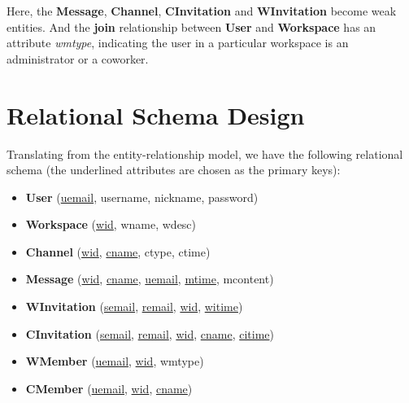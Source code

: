 \documentclass{article}
\begin{document}
Here, the \textbf{Message}, \textbf{Channel}, \textbf{CInvitation} and \textbf{WInvitation} become weak entities. And the \textbf{join} relationship between \textbf{User} and \textbf{Workspace} has an attribute \textit{wmtype}, indicating the user in a particular workspace is an administrator or a coworker.

\newpage


\section{Relational Schema Design}

Translating from the entity-relationship model, we have the following relational schema (the underlined attributes are chosen as the primary keys):
\begin{itemize}
    \item \textbf{User} (\underline{uemail}, username, nickname, password)
    \item \textbf{Workspace} (\underline{wid}, wname, wdesc)
    \item \textbf{Channel} (\underline{wid}, \underline{cname}, ctype, ctime)
    \item \textbf{Message} (\underline{wid}, \underline{cname}, \underline{uemail}, \underline{mtime}, mcontent)
    \item \textbf{WInvitation} (\underline{semail}, \underline{remail}, \underline{wid}, \underline{witime})
    \item \textbf{CInvitation} (\underline{semail}, \underline{remail}, \underline{wid}, \underline{cname}, \underline{citime})
    \item \textbf{WMember} (\underline{uemail}, \underline{wid}, wmtype)
    \item \textbf{CMember} (\underline{uemail}, \underline{wid}, \underline{cname})
\end{itemize}

\smallskip
\end{document}
